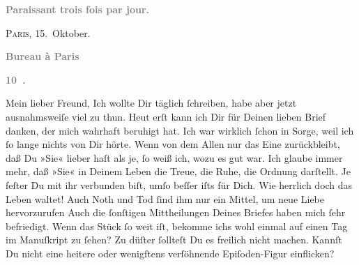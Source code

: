 \begin{ledgroupsized}[t]{13cm}
           \pstart
           \begin{otherlanguage}{french}\textcolor{gray}{\textbf{\textbf{Paraissant trois fois par jour.}}}\end{otherlanguage}\hfill \textsc{Paris}, 15. Oktober.\pend
           \pstart
           \begin{otherlanguage}{french}\textcolor{gray}{\textbf{\textbf{Bureau à Paris}}}\end{otherlanguage}\pend
           \pstart
           \begin{otherlanguage}{french}\textcolor{gray}{\textbf{\textbf{10 .}}}\end{otherlanguage}\pend
           \pstart\center{}Mein lieber Freund,\pend\pstart
           Ich wollte Dir täglich ſchreiben, habe aber jetzt ausnahmsweiſe viel zu thun. Heut erſt kann ich Dir für Deinen lieben Brief danken,
               der mich wahrhaft beruhigt hat. Ich war wirklich ſchon in Sorge, weil ich ſo lange
               nichts \introOben{}von Dir\introOben{} hörte.\pend
           \pstart
           Wenn von dem Allen nur das Eine zurückbleibt, daß Du »Sie« lieber haſt als je, ſo weiß ich, wozu
               es gut war. Ich glaube immer mehr, daß »Sie« in Deinem Leben die Treue, die Ruhe, die Ordnung
               darſtellt. Je feſter Du mit ihr verbunden biſt, umſo beſſer iſts für Dich. Wie
               herrlich doch {\pb}das Leben waltet! Auch Noth und Tod
               ſind ihm nur ein Mittel, um neue Liebe hervorzurufen{\dotsfive}\pend
           \pstart
           Auch die ſonſtigen Mittheilungen Deines Briefes haben mich ſehr befriedigt. Wenn das
                  Stück ſo weit
               iſt, bekomme ichs wohl einmal auf einen Tag im Manuſkript zu ſehen? Zu düſter
               ſollteſt Du es freilich nicht machen. Kannſt Du nicht eine heitere oder wenigſtens
               verſöhnende Epiſoden-Figur einflicken? {\dotsfive}\pend
           \pstart

\end{ledgroupsized}

